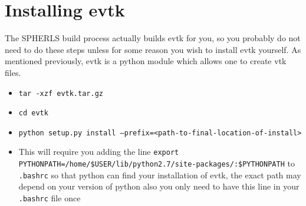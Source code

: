 \documentclass[12pt,a4paper]{book}
\begin{document}
\section{Installing evtk}
The SPHERLS build process actually builds evtk for you, so you probably do not need to do these steps unless for some reason you wish to install evtk yourself. As mentioned previously, evtk is a python module which allows one to create vtk files.
\begin{itemize}
\item {\tt tar -xzf evtk.tar.gz}
\item {\tt cd evtk}
\item {\tt  python setup.py install --prefix=<path-to-final-location-of-install>}
\item This will require you adding the line {\tt export PYTHONPATH\-=/home/\-\$USER/\-lib/\-python2.7/\-site-packages/\-:\$PYTHONPATH} to {\tt .bashrc} so that python can find your installation of evtk, the exact path may depend on your version of python also you only need to have this line in your {\tt .bashrc} file once
\end{itemize}

\end{document}
